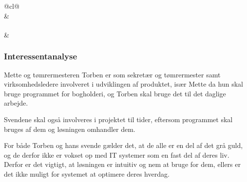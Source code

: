 \begin{table}[H]
\begin{tabular}{@{}cl@{}}
                                                                                                                                                                                                                                                            \\ \midrule
{}                                                                                                &                                   \\ \midrule
{}                                                                                                                                                                               \\ \midrule
{} &  \\ \bottomrule
\end{tabular}
\end{table}

\subsubsection{Interessentanalyse}
Mette og tømrermesteren Torben er som sekretær og tømrermester samt virksomhedsledere involveret i udviklingen af produktet, især Mette da hun skal bruge programmet for bogholderi, og Torben skal bruge det til det daglige arbejde.

Svendene skal også involveres i projektet til tider, eftersom programmet skal bruges af dem og løsningen omhandler dem.

For både Torben og hans svende gælder det, at de alle er en del af det grå guld, og de derfor ikke er vokset op med IT systemer som en fast del af deres liv.
Derfor er det vigtigt, at løsningen er intuitiv og nem at bruge for dem, ellers er det ikke muligt for systemet at optimere deres hverdag.
